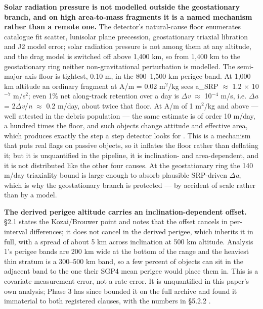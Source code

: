 \documentclass[11pt]{article}
\begin{document}
\textbf{Solar radiation pressure is not modelled outside the geostationary branch, and on high area-to-mass fragments it is a named mechanism rather than a remote one.} The detector's natural-cause floor enumerates catalogue fit scatter, lunisolar plane precession, geostationary triaxial libration and J2 model error; solar radiation pressure is not among them at any altitude, and the drag model is switched off above 1,400 km, so from 1,400 km to the geostationary ring neither non-gravitational perturbation is modelled. The semi-major-axis floor is tightest, 0.10 m, in the 800--1,500 km perigee band. At 1,000 km altitude an ordinary fragment at A/m = 0.02 m\ensuremath{^{2}}/kg sees a\_SRP $\approx$ 1.2 $\times$ 10\ensuremath{^{-7}} m/s\ensuremath{^{2}}; even 1\% net along-track retention over a day is $\Delta$\emph{v} $\approx$ 10\ensuremath{^{-4}} m/s, i.e. $\Delta$\emph{a} = 2$\Delta$\emph{v}/\emph{n} $\approx$ 0.2 m/day, about twice that floor. At A/m of 1 m\ensuremath{^{2}}/kg and above --- well attested in the debris population --- the same estimate is of order 10 m/day, a hundred times the floor, and such objects change attitude and effective area, which produces exactly the step a step detector looks for%
. This is a mechanism that puts real flags on passive objects, so it inflates the floor rather than deflating it; but it is unquantified in the pipeline, it is inclination- and area-dependent, and it is not distributed like the other four causes. At the geostationary ring the 140 m/day triaxiality bound is large enough to absorb plausible SRP-driven $\Delta$\emph{a}, which is why the geostationary branch is protected --- by accident of scale rather than by a model.

\textbf{The derived perigee altitude carries an inclination-dependent offset.} \S{}2.1 states the Kozai/Brouwer point and notes that the offset cancels in per-interval differences; it does not cancel in the derived perigee, which inherits it in full, with a spread of about 5 km across inclination at 500 km altitude. Analysis 1's perigee bands are 200 km wide at the bottom of the range and the heaviest thin stratum is a 300--500 km band, so a few percent of objects can sit in the adjacent band to the one their SGP4 mean perigee would place them in. This is a covariate-measurement error, not a rate error. It is unquantified in this paper's own analysis; Phase 3 has since bounded it on the full archive and found it immaterial to both registered clauses, with the numbers in \S{}5.2.2%
.
\end{document}
